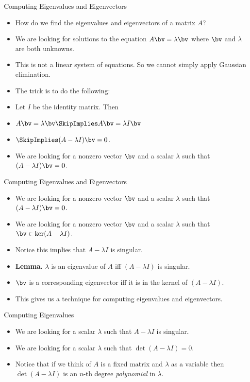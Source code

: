 \documentclass{beamer}
\begin{document}
\begin{frame}{Computing Eigenvalues and Eigenvectors}


\begin{itemize}
\item How do we find the eigenvalues and eigenvectors of a matrix $A$?
\item We are looking for solutions to the equation $A\bv=\lambda\bv$
where $\bv$ and $\lambda$ are both unknowns.
\item This is not a linear system of equations. So we cannot simply apply Gaussian elimination.
\item The trick is to do the following:
\item Let $I$ be the identity matrix. Then
\item $A\bv=\lambda\bv \SkipImplies A\bv = \lambda I \bv$
\item $\SkipImplies (A-\lambda I) \bv = 0$.
\item We are looking for a nonzero vector $\bv$ and a scalar $\lambda$ such that $(A-\lambda I) \bv = 0$.
\end{itemize}
\end{frame}


\begin{frame}{Computing Eigenvalues and Eigenvectors}


\begin{itemize}
\item We are looking for a nonzero vector $\bv$ and a scalar $\lambda$ such that $(A-\lambda I) \bv = 0$.
\item We are looking for a nonzero vector $\bv$ and a scalar $\lambda$ such that $\bv\in\ker(A-\lambda I)$.
\item Notice this implies that $A - \lambda I$ is singular.
\item \textbf{Lemma.} $\lambda$ is an eigenvalue of $A$ iff $(A-\lambda I)$ is singular.
\item $\bv$ is a corresponding eigenvector iff it is in the kernel of $(A-\lambda I)$.
\item This gives us a technique for computing eigenvalues and eigenvectors.
\end{itemize}
\end{frame}


\begin{frame}{Computing Eigenvalues}


\begin{itemize}
\item We are looking for a scalar $\lambda$ such that $A-\lambda I$ is singular.
\item We are looking for a scalar $\lambda$ such that $\det(A-\lambda I) = 0$.
\item Notice that if we think of $A$ is a fixed matrix and $\lambda$ as a variable then $\det(A-\lambda I)$ is an
$n$-th degree \emph{polynomial} in $\lambda$.
\end{itemize}
\end{frame}
\end{document}
